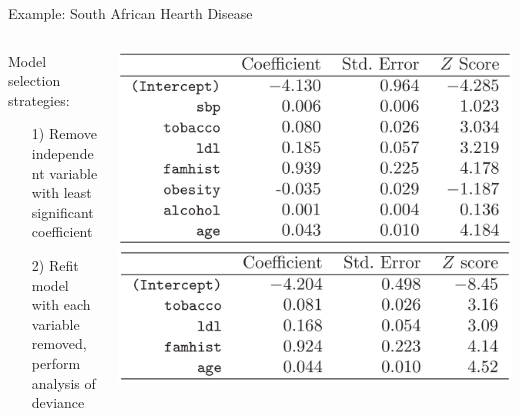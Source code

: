\documentclass{beamer}
\begin{document}
\begin{frame}{Example: South African Hearth Disease}

\begin{columns}
\begin{column}{0.5\textwidth}
\begin{center}
Model selection strategies:
\begin{itemize}
\item[1)] Remove independent variable with least significant coefficient
\item[2)] Refit model with each variable removed, perform analysis of deviance
\end{itemize}
\end{center}
\end{column}
\begin{column}{0.5\textwidth}
\begin{center}
\includegraphics[width=\textwidth]{heart_results_all.png}
\includegraphics[width=\textwidth]{hearth_results_selected.png}
\end{center}
\end{column}
\end{columns}
\end{frame}
\end{document}

